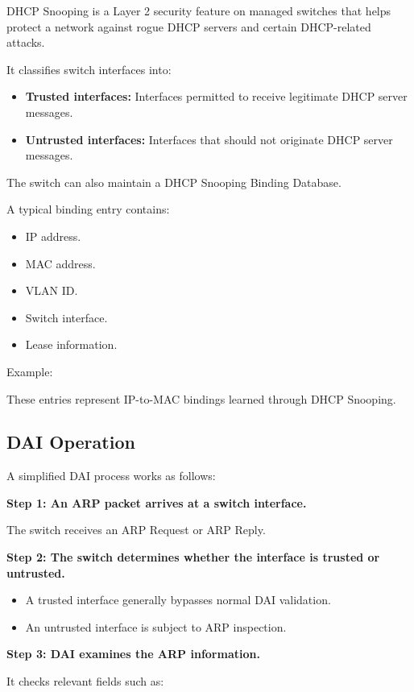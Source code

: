 DHCP Snooping is a Layer 2 security feature on managed switches that helps protect a network against rogue DHCP servers and certain DHCP-related attacks.

It classifies switch interfaces into:

\begin{itemize}
\item \textbf{Trusted interfaces:} Interfaces permitted to receive legitimate DHCP server messages.
\item \textbf{Untrusted interfaces:} Interfaces that should not originate DHCP server messages.
\end{itemize}

The switch can also maintain a DHCP Snooping Binding Database.

A typical binding entry contains:

\begin{itemize}
\item IP address.
\item MAC address.
\item VLAN ID.
\item Switch interface.
\item Lease information.
\end{itemize}

Example:


These entries represent IP-to-MAC bindings learned through DHCP Snooping.

\subsection{DAI Operation}

A simplified DAI process works as follows:

\textbf{Step 1: An ARP packet arrives at a switch interface.}

The switch receives an ARP Request or ARP Reply.

\textbf{Step 2: The switch determines whether the interface is trusted or untrusted.}

\begin{itemize}
\item A trusted interface generally bypasses normal DAI validation.
\item An untrusted interface is subject to ARP inspection.
\end{itemize}

\textbf{Step 3: DAI examines the ARP information.}

It checks relevant fields such as:

